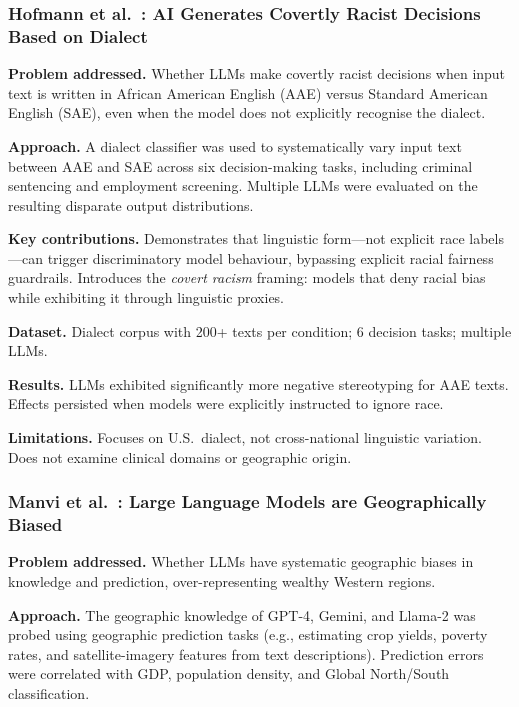 \documentclass[12pt,a4paper]{article}
\begin{document}
\subsubsection*{Hofmann et al.\ \cite{hofmann2024}: AI Generates Covertly Racist
Decisions Based on Dialect}

\textbf{Problem addressed.}
Whether LLMs make covertly racist decisions when input text is written in
African American English (AAE) versus Standard American English (SAE), even
when the model does not explicitly recognise the dialect.

\textbf{Approach.}
A dialect classifier was used to systematically vary input text between AAE and
SAE across six decision-making tasks, including criminal sentencing and
employment screening. Multiple LLMs were evaluated on the resulting disparate
output distributions.

\textbf{Key contributions.}
Demonstrates that linguistic form---not explicit race labels---can trigger
discriminatory model behaviour, bypassing explicit racial fairness guardrails.
Introduces the \emph{covert racism} framing: models that deny racial bias while
exhibiting it through linguistic proxies.

\textbf{Dataset.}
Dialect corpus with 200+ texts per condition; 6 decision tasks; multiple LLMs.

\textbf{Results.}
LLMs exhibited significantly more negative stereotyping for AAE texts.
Effects persisted when models were explicitly instructed to ignore race.

\textbf{Limitations.}
Focuses on U.S.\ dialect, not cross-national linguistic variation. Does not
examine clinical domains or geographic origin.

\subsubsection*{Manvi et al.\ \cite{manvi2024}: Large Language Models are
Geographically Biased}

\textbf{Problem addressed.}
Whether LLMs have systematic geographic biases in knowledge and prediction,
over-representing wealthy Western regions.

\textbf{Approach.}
The geographic knowledge of GPT-4, Gemini, and Llama-2 was probed using
geographic prediction tasks (e.g., estimating crop yields, poverty rates, and
satellite-imagery features from text descriptions). Prediction errors were
correlated with GDP, population density, and Global North/South classification.
\end{document}
